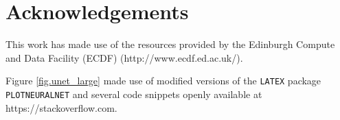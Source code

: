 \chapter{Acknowledgements}

This work has made use of the resources provided by the Edinburgh Compute and Data Facility (ECDF) (http://www.ecdf.ed.ac.uk/).

Figure \ref{fig.unet_large} made use of modified versions of the \texttt{LATEX} package \texttt{PLOTNEURALNET}
\citep{iqbal18} and several code snippets openly available at https://stackoverflow.com. 
